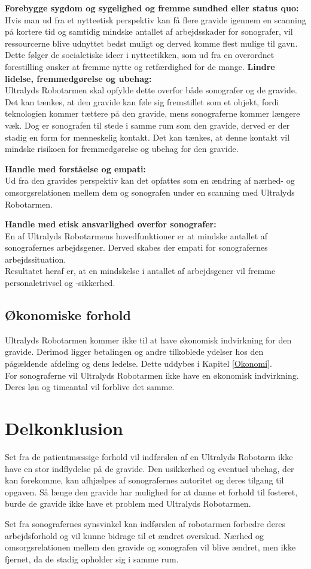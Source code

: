 \textbf{Forebygge sygdom og sygelighed og fremme sundhed eller status quo:} \\
Hvis man ud fra et nytteetisk perspektiv kan få flere gravide igennem en scanning på kortere tid og samtidig mindske antallet af arbejdsskader for sonografer, vil ressourcerne blive udnyttet bedst muligt og derved komme flest mulige til gavn. Dette følger de socialetiske ideer i nytteetikken, som ud fra en overordnet forestilling ønsker at fremme nytte og retfærdighed for de mange.
\newpage   
\textbf{Lindre lidelse, fremmedgørelse og ubehag:}\\
Ultralyds Robotarmen skal opfylde dette overfor både sonografer og de gravide. Det kan tænkes, at den gravide kan føle sig fremstillet som et objekt, fordi teknologien kommer tættere på den gravide, mens sonograferne kommer længere væk. Dog er sonografen til stede i samme rum som den gravide, derved er der stadig en form for menneskelig kontakt. Det kan tænkes, at denne kontakt vil mindske risikoen for fremmedgørelse og ubehag for den gravide.   

\textbf{Handle med forståelse og empati:}\\
Ud fra den gravides perspektiv kan det opfattes som en ændring af nærhed- og omsorgsrelationen mellem dem og sonografen under en scanning med Ultralyds Robotarmen. 

\textbf{Handle med etisk ansvarlighed overfor sonografer:}\\
En af Ultralyds Robotarmens hovedfunktioner er at mindske antallet af sonografernes arbejdsgener. Derved skabes der empati for sonografernes arbejdssituation.\\
Resultatet heraf er, at en mindskelse i antallet af arbejdsgener vil fremme personaletrivsel og -sikkerhed.   		

\subsection{Økonomiske forhold}
Ultralyds Robotarmen kommer ikke til at have økonomisk indvirkning for den gravide. Derimod ligger betalingen og andre tilkoblede ydelser hos den pågældende afdeling og dens ledelse. Dette uddybes i Kapitel \ref{Okonomi}. \\
For sonograferne vil Ultralyds Robotarmen ikke have en økonomisk indvirkning. Deres løn og timeantal vil forblive det samme. 

\section{Delkonklusion}
Set fra de patientmæssige forhold vil indførslen af en Ultralyds Robotarm ikke have en stor indflydelse på de gravide. Den usikkerhed og eventuel ubehag, der kan forekomme, kan afhjælpes af sonografernes autoritet og deres tilgang til opgaven. Så længe den gravide har mulighed for at danne et forhold til fosteret, burde de gravide ikke have et problem med Ultralyds Robotarmen. 

Set fra sonografernes synsvinkel kan indførslen af robotarmen forbedre deres arbejdsforhold og vil kunne bidrage til et ændret overskud. Nærhed og omsorgsrelationen mellem den gravide og sonografen vil blive ændret, men ikke fjernet, da de stadig opholder sig i samme rum. 